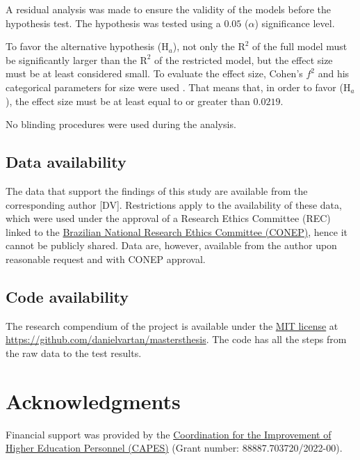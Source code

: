 \documentclass[
12pt,
openright,
oneside,
a4paper,
chapter=TITLE,
section=TITLE,
french,
spanish,
brazil,
english
]{abntex2}\usepackage{array}
\begin{document}
A residual analysis was made to ensure the validity of the models before
the hypothesis test. The hypothesis was tested using a \(0.05\)
(\(\alpha\)) significance level.

To favor the alternative hypothesis (\(\text{H}_{a}\)), not only the
\(\text{R}^{2}\) of the full model must be significantly larger than the
\(\text{R}^{2}\) of the restricted model, but the effect size must be at
least considered small. To evaluate the effect size, Cohen's \(f^{2}\)
and his categorical parameters for size were used \autocite{cohen1992}.
That means that, in order to favor (\(\text{H}_{a}\)), the effect size
must be at least equal to or greater than \(0.0219\).

No blinding procedures were used during the analysis.

\subsection{Data availability}\label{data-availability}

The data that support the findings of this study are available from the
corresponding author {[}DV{]}. Restrictions apply to the availability of
these data, which were used under the approval of a Research Ethics
Committee (REC) linked to the
\href{https://conselho.saude.gov.br/Web_comissoes/conep/index.html}{Brazilian
National Research Ethics Committee (CONEP)}, hence it cannot be publicly
shared. Data are, however, available from the author upon reasonable
request and with CONEP approval.

\subsection{Code availability}\label{code-availability}

The research compendium of the project is available under the
\href{https://opensource.org/license/mit/}{MIT license} at
\url{https://github.com/danielvartan/mastersthesis}. The code has all
the steps from the raw data to the test results.

\section{Acknowledgments}\label{acknowledgments}

Financial support was provided by the
\href{https://www.gov.br/capes/}{Coordination for the Improvement of
Higher Education Personnel (CAPES)} (Grant number:
88887.703720/2022-00).
\end{document}
